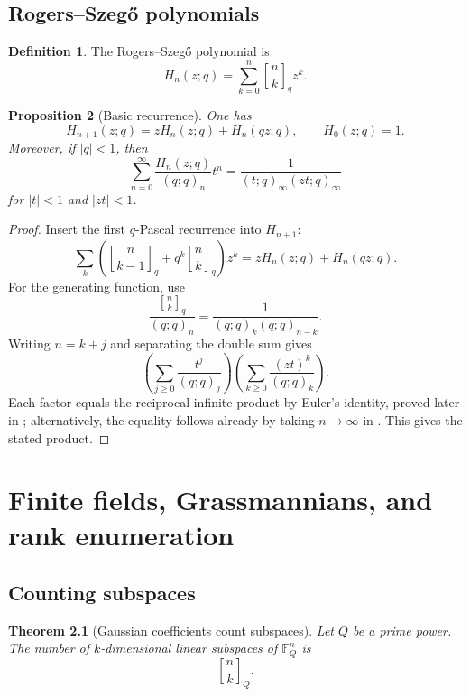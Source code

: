 \documentclass[11pt,oneside,openany]{book}
\newtheorem{theorem}{Theorem}[chapter]
\newtheorem{proposition}[theorem]{Proposition}
\theoremstyle{definition}
\newtheorem{definition}[theorem]{Definition}
\theoremstyle{remark}
\newcommand{\qbinom}[2]{\genfrac{[}{]}{0pt}{}{#1}{#2}_{q}}
\newcommand{\Qbinom}[3]{\genfrac{[}{]}{0pt}{}{#1}{#2}_{#3}}
\newcommand{\F}{\mathbb F}
\newcommand{\abs}[1]{\lvert #1\rvert}
\begin{document}
\section{Rogers--Szeg\H{o} polynomials}

\begin{definition}
The Rogers--Szeg\H{o} polynomial is
\[
 H_n(z;q)=\sum_{k=0}^{n}\qbinom nk z^k.
\]
\end{definition}

\begin{proposition}[Basic recurrence]\label{prop:rogers-szego-recurrence}
One has
\[
 H_{n+1}(z;q)=zH_n(z;q)+H_n(qz;q),
 \qquad H_0(z;q)=1.
\]
Moreover, if $\abs q<1$, then
\[
 \sum_{n=0}^{\infty}\frac{H_n(z;q)}{(q;q)_n}t^n
 =\frac1{(t;q)_\infty(zt;q)_\infty}
\]
for $\abs t<1$ and $\abs{zt}<1$.
\end{proposition}

\begin{proof}
Insert the first $q$-Pascal recurrence into $H_{n+1}$:
\[
 \sum_k\left(\qbinom n{k-1}+q^k\qbinom nk\right)z^k
 =zH_n(z;q)+H_n(qz;q).
\]
For the generating function, use
\[
 \frac{\qbinom nk}{(q;q)_n}=\frac1{(q;q)_k(q;q)_{n-k}}.
\]
Writing $n=k+j$ and separating the double sum gives
\[
 \left(\sum_{j\ge0}\frac{t^j}{(q;q)_j}\right)
 \left(\sum_{k\ge0}\frac{(zt)^k}{(q;q)_k}\right).
\]
Each factor equals the reciprocal infinite product by Euler's identity, proved later in ; alternatively, the equality follows already by taking $n\to\infty$ in .  This gives the stated product.
\end{proof}

\chapter{Finite fields, Grassmannians, and rank enumeration}\label{chap:finite-geometry}

\section{Counting subspaces}

\begin{theorem}[Gaussian coefficients count subspaces]\label{thm:subspace-count}
Let $Q$ be a prime power.  The number of $k$-dimensional linear subspaces of $\F_Q^n$ is
\[
 \Qbinom nkQ.
\]
\end{theorem}
\end{document}
